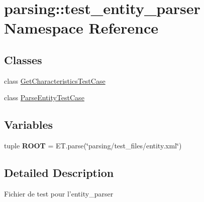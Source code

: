 \hypertarget{namespaceparsing_1_1test__entity__parser}{\section{parsing\-:\-:test\-\_\-entity\-\_\-parser \-Namespace \-Reference}
\label{namespaceparsing_1_1test__entity__parser}
}
\subsection*{\-Classes}
\begin{DoxyCompactItemize}
\item 
class \hyperlink{classparsing_1_1test__entity__parser_1_1_get_characteristics_test_case}{\-Get\-Characteristics\-Test\-Case}
\item 
class \hyperlink{classparsing_1_1test__entity__parser_1_1_parse_entity_test_case}{\-Parse\-Entity\-Test\-Case}
\end{DoxyCompactItemize}
\subsection*{\-Variables}
\begin{DoxyCompactItemize}
\item 
\hypertarget{namespaceparsing_1_1test__entity__parser_a9b468657016990dd3b9da686bc3e2377}{tuple {\bfseries \-R\-O\-O\-T} = \-E\-T.\-parse(\char`\"{}parsing/test\-\_\-files/entity.\-xml\char`\"{})}\label{namespaceparsing_1_1test__entity__parser_a9b468657016990dd3b9da686bc3e2377}

\end{DoxyCompactItemize}


\subsection{\-Detailed \-Description}
\begin{DoxyVerb}
Fichier de test pour l'entity_parser
\end{DoxyVerb}
 
